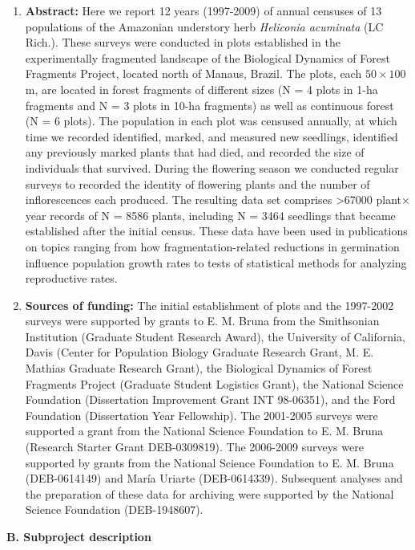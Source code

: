 \documentclass[
  12pt,
  man, donotrepeattitle,floatsintext]{apa6}
\begin{document}
\begin{enumerate}
\def\labelenumi{\arabic{enumi}.}
\setcounter{enumi}{4}
\item
  \textbf{Abstract:} Here we report 12 years (1997-2009) of annual censuses of 13 populations of the Amazonian understory herb \emph{Heliconia acuminata} (LC Rich.). These surveys were conducted in plots established in the experimentally fragmented landscape of the Biological Dynamics of Forest Fragments Project, located north of Manaus, Brazil. The plots, each \(50\times100\)m, are located in forest fragments of different sizes (N = 4 plots in 1-ha fragments and N = 3 plots in 10-ha fragments) as well as continuous forest (N = 6 plots). The population in each plot was censused annually, at which time we recorded identified, marked, and measured new seedlings, identified any previously marked plants that had died, and recorded the size of individuals that survived. During the flowering season we conducted regular surveys to recorded the identity of flowering plants and the number of inflorescences each produced. The resulting data set comprises \textgreater67000 plant\(\times\)year records of N = 8586 plants, including N = 3464 seedlings that became established after the initial census. These data have been used in publications on topics ranging from how fragmentation-related reductions in germination influence population growth rates to tests of statistical methods for analyzing reproductive rates.
\item
  \textbf{Sources of funding:} The initial establishment of plots and the 1997-2002 surveys were supported by grants to E. M. Bruna from the Smithsonian Institution (Graduate Student Research Award), the University of California, Davis (Center for Population Biology Graduate Research Grant, M. E. Mathias Graduate Research Grant), the Biological Dynamics of Forest Fragments Project (Graduate Student Logistics Grant), the National Science Foundation (Dissertation Improvement Grant INT 98-06351), and the Ford Foundation (Dissertation Year Fellowship). The 2001-2005 surveys were supported a grant from the National Science Foundation to E. M. Bruna (Research Starter Grant DEB-0309819). The 2006-2009 surveys were supported by grants from the National Science Foundation to E. M. Bruna (DEB-0614149) and María Uriarte (DEB-0614339). Subsequent analyses and the preparation of these data for archiving were supported by the National Science Foundation (DEB-1948607).
\end{enumerate}

\noindent  
\textbf{B. Subproject description}
\end{document}
